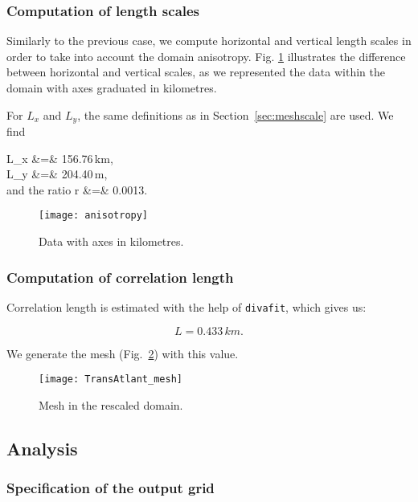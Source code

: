 \subsubsection{Computation of length scales}

Similarly to the previous case, we compute horizontal and vertical length scales in order to take into account the domain anisotropy. Fig. \ref{fig:anisotropy} illustrates the difference between horizontal and vertical scales, as we represented the data within the domain with axes graduated in kilometres.

For $L_x$ and $L_y$, the same definitions as in Section~\ref{sec:meshscale} are used. We find

\beqn
L_x &=& 156.76\,km, \\
L_y &=& 204.40\,m, \\
\textrm{and the ratio\qquad} r &=&  0.0013.
\eeqn

\begin{figure}[htpb]
\centering
\texttt{[image: anisotropy]}
\caption{Data with axes in kilometres.\label{fig:anisotropy}}
\end{figure}



\subsubsection{Computation of correlation length}

Correlation length is estimated with the help of \texttt{divafit}, which gives us:

\[L=0.433\,km.\]

We generate the mesh (Fig.~\ref{fig:trans_mesh}) with this value.

\begin{figure}[H]
\centering
\texttt{[image: TransAtlant\_mesh]}
\caption{Mesh in the rescaled domain.\label{fig:trans_mesh}}
\end{figure}



\subsection{Analysis}

\subsubsection{Specification of the output grid}

